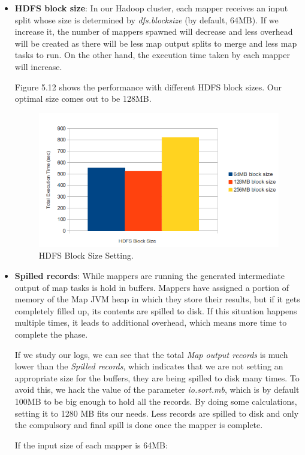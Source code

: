 \begin{itemize}
\item \textbf{HDFS block size}: In our Hadoop cluster, each mapper receives an input split whose size is determined by \textit{dfs.blocksize} (by default, 64MB). If we increase it, the number of mappers spawned will decrease and less overhead will be created as there will be less map output splits to merge and less map tasks to run. On the other hand, the execution time taken by each mapper will increase. 
\par
Figure 5.12 shows the performance with different HDFS block sizes. Our optimal size comes out to be 128MB.

\begin{figure}[htb]
\centering
\includegraphics[width=1\textwidth]{./images/HDFSBlockSize.png}
\caption{HDFS Block Size Setting.} \label{fig:HDFSBlockSize}
\end{figure}




\item \textbf{Spilled records}: While mappers are running the generated intermediate output of map tasks is hold in buffers. Mappers have assigned a portion of memory of the Map JVM heap in which they store their results, but if it gets completely filled up, its contents are spilled to disk. If this situation happens multiple times, it leads to additional overhead, which means more time to complete the phase. 
\par
If we study our logs, we can see that the total \textit{Map output records} is much lower than the \textit{Spilled records}, which indicates that we are not setting an appropriate size for the buffers, they are being spilled to disk many times. To avoid this, we hack the value of the parameter \textit{io.sort.mb}, which is by default 100MB to be big enough to hold all the records. By doing some calculations, setting it to 1280 MB fits our needs. Less records are spilled to disk and only the compulsory and final spill is done once the mapper is complete.
\par
If the input size of each mapper is 64MB:
\bigskip


\end{itemize}
